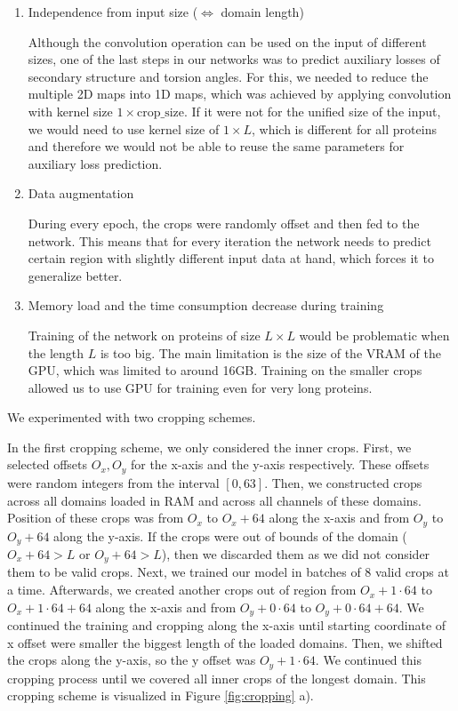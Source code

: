 \begin{enumerate}
    \item Independence from input size ($\Leftrightarrow$ domain length)

Although the convolution operation can be used on the input of different sizes, one of the last steps in our networks was to predict auxiliary losses of secondary structure and torsion angles.
For this, we needed to reduce the multiple 2D maps into 1D maps, which was achieved by applying convolution with kernel size $1 \times \text{crop\_size}$.
If it were not for the unified size of the input, we would need to use kernel size of $1 \times L$, which is different for all proteins and therefore we would not be able to reuse the same parameters for auxiliary loss prediction.

    \item Data augmentation
    
During every epoch, the crops were randomly offset and then fed to the network. This means that for every iteration the network needs to predict certain region with slightly different input data at hand, which forces it to generalize better.

    \item Memory load and the time consumption decrease during training
    
Training of the network on proteins of size $L \times L$ would be problematic when the length $L$ is too big.
The main limitation is the size of the VRAM of the GPU, which was limited to around 16GB. Training on the smaller crops allowed us to use GPU for training even for very long proteins.

\end{enumerate}

We experimented with two cropping schemes.

In the first cropping scheme, we only considered the inner crops.
First, we selected offsets $O_x, O_y$ for the x-axis and the y-axis respectively. 
These offsets were random integers from the interval $[0, 63]$.
Then, we constructed crops across all domains loaded in RAM and across all channels of these domains.
Position of these crops was from $O_x$ to $O_x + 64$ along the x-axis and from $O_y$ to $O_y + 64$ along the y-axis.
If the crops were out of bounds of the domain ($O_x + 64 > L$ or $O_y + 64 > L$), then we discarded them as we did not consider them to be valid crops.
Next, we trained our model in batches of 8 valid crops at a time.
Afterwards, we created another crops out of region from $O_x + 1 \cdot 64$ to $O_x + 1 \cdot 64 + 64$ along the x-axis and from $O_y + 0 \cdot 64$ to $O_y + 0 \cdot 64 + 64$.
We continued the training and cropping along the x-axis until starting coordinate of x offset were smaller the biggest length of the loaded domains.
Then, we shifted the crops along the y-axis, so the y offset was $O_y + 1 \cdot 64$.
We continued this cropping process until we covered all inner crops of the longest domain.
This cropping scheme is visualized in Figure \ref{fig:cropping} a).

